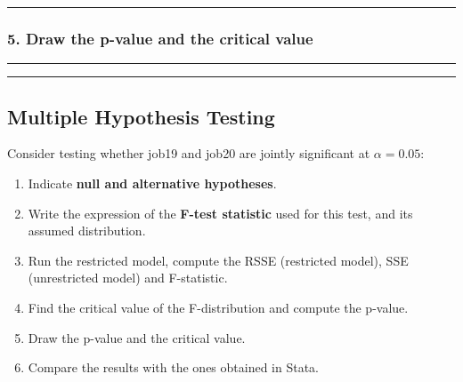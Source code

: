 \documentclass[
  letterpaper,
  DIV=11,
  numbers=noendperiod]{scrartcl}
\providecommand{\tightlist}{%
  \setlength{\itemsep}{0pt}\setlength{\parskip}{0pt}}
\begin{document}
\begin{center}\rule{0.5\linewidth}{0.5pt}\end{center}

\subsubsection{5. Draw the p-value and the critical
value}\label{draw-the-p-value-and-the-critical-value}

\begin{center}\rule{0.5\linewidth}{0.5pt}\end{center}

\begin{center}\rule{0.5\linewidth}{0.5pt}\end{center}

\subsection{Multiple Hypothesis
Testing}\label{multiple-hypothesis-testing}

Consider testing whether job19 and job20 are jointly significant at
\(\alpha=0.05\):

\begin{tcolorbox}[enhanced jigsaw, rightrule=.15mm, leftrule=.75mm, colback=white, left=2mm, colframe=quarto-callout-warning-color-frame, coltitle=black, opacitybacktitle=0.6, bottomrule=.15mm, toprule=.15mm, colbacktitle=quarto-callout-warning-color!10!white, breakable, titlerule=0mm, opacityback=0, toptitle=1mm, bottomtitle=1mm, title={Exercise}, arc=.35mm]

\begin{enumerate}
\def\labelenumi{\arabic{enumi}.}
\tightlist
\item
  Indicate \textbf{null and alternative hypotheses}.
\item
  Write the expression of the \textbf{F-test statistic} used for this
  test, and its assumed distribution.
\item
  Run the restricted model, compute the RSSE (restricted model), SSE
  (unrestricted model) and F-statistic.
\item
  Find the critical value of the F-distribution and compute the p-value.
\item
  Draw the p-value and the critical value.
\item
  Compare the results with the ones obtained in Stata.
\end{enumerate}

\end{tcolorbox}
\end{document}

